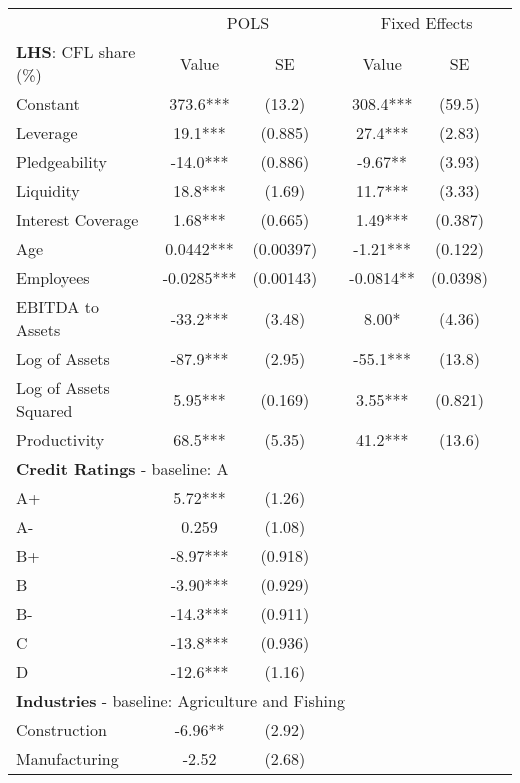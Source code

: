 \documentclass[12pt]{article}
\begin{document}
\begin{table}[H]
    \centering
    \label{tab:your_table_label}
    \begin{tabular}{lcccccc}
    \toprule
    & \multicolumn{3}{c}{POLS} & \multicolumn{3}{c}{Fixed Effects} \\
    \cmidrule(lr){2-4} \cmidrule(lr){5-7}
    \textbf{LHS}: CFL share (\%) & Value & SE & & Value & SE & \\
    \midrule
    Constant & 373.6*** & (13.2) & & 308.4*** & (59.5) & \\
    Leverage & 19.1*** & (0.885) & & 27.4*** & (2.83) & \\
    Pledgeability & -14.0*** & (0.886) & & -9.67** & (3.93) & \\
    Liquidity & 18.8*** & (1.69) & & 11.7*** & (3.33) & \\
    Interest Coverage & 1.68*** & (0.665) & & 1.49*** & (0.387) & \\
    Age & 0.0442*** & (0.00397) & & -1.21*** & (0.122) & \\
    Employees & -0.0285*** & (0.00143) & & -0.0814** & (0.0398) & \\
    EBITDA to Assets & -33.2*** & (3.48) & & 8.00* & (4.36) & \\
    Log of Assets & -87.9*** & (2.95) & & -55.1*** & (13.8) & \\
    Log of Assets Squared & 5.95*** & (0.169) & & 3.55*** & (0.821) & \\
    Productivity & 68.5*** & (5.35) & & 41.2*** & (13.6) & \vspace{2mm} \\
    \multicolumn{7}{l}{\textbf{Credit Ratings} - baseline: A} \\
    A+  & 5.72*** & (1.26) & & & & \\
    A-  & 0.259 & (1.08) & & & & \\
    B+  & -8.97*** & (0.918) & & & & \\
    B   & -3.90*** & (0.929) & & & & \\
    B-  & -14.3*** & (0.911) & & & & \\
    C   & -13.8*** & (0.936) & & & & \\
    D   & -12.6*** & (1.16) & & & & \vspace{2mm} \\
    \multicolumn{7}{l}{\textbf{Industries} - baseline: Agriculture and Fishing} \\
    Construction & -6.96** & (2.92) & & & & \\
    Manufacturing & -2.52 & (2.68) & & & & \\

\end{tabular}
\end{table}
\end{document}
